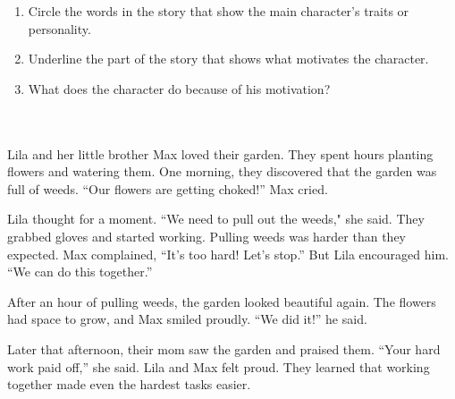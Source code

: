 \documentclass[12pt]{article}
\begin{document}
\vspace{1em}
\begin{tcolorbox}[colframe=black!60, colback=white, 
coltitle=black, colbacktitle=black!15, fonttitle=\bfseries\Large, 
title=Guided Practice, halign title=center, left=10pt, right=10pt, top=10pt, bottom=15pt]

\begin{enumerate}[itemsep=1em]
    \item Circle the words in the story that show the main character's traits or personality.
    \item Underline the part of the story that shows what motivates the character.
    \item What does the character do because of his motivation?
    \\[0.8cm] \underline{\hspace{14cm}}  
    \\[0.8cm] \underline{\hspace{14cm}}  
    \\[0.8cm] \underline{\hspace{14cm}} 
\end{enumerate}
\end{tcolorbox}
\vspace{1em}
\begin{tcolorbox}[colframe=black!60, colback=white, 
coltitle=black, colbacktitle=black!15, fonttitle=\bfseries\Large, 
title=Text: The Great Garden Rescue, halign title=center, left=10pt, right=10pt, top=10pt, bottom=15pt]
Lila and her little brother Max loved their garden. They spent hours planting flowers and watering them. One morning, they discovered that the garden was full of weeds. “Our flowers are getting choked!” Max cried.

Lila thought for a moment. “We need to pull out the weeds," she said. They grabbed gloves and started working. Pulling weeds was harder than they expected. Max complained, “It’s too hard! Let’s stop.” But Lila encouraged him. “We can do this together.”

After an hour of pulling weeds, the garden looked beautiful again. The flowers had space to grow, and Max smiled proudly. “We did it!” he said.

Later that afternoon, their mom saw the garden and praised them. “Your hard work paid off,” she said. Lila and Max felt proud. They learned that working together made even the hardest tasks easier.
\end{tcolorbox}
\end{document}
